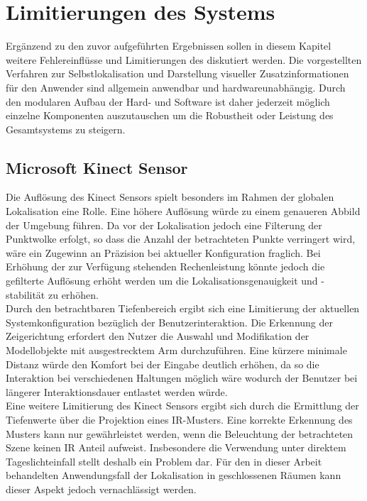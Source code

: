 \chapter{Limitierungen des Systems}
Ergänzend zu den zuvor aufgeführten Ergebnissen sollen in diesem Kapitel weitere Fehlereinflüsse und Limitierungen des  diskutiert werden. Die vorgestellten Verfahren zur Selbstlokalisation und Darstellung visueller Zusatzinformationen für den Anwender sind allgemein anwendbar und hardwareunabhängig. Durch den modularen Aufbau der Hard- und Software ist daher jederzeit möglich einzelne Komponenten auszutauschen um die Robustheit oder Leistung des Gesamtsystems zu steigern.

\section{Microsoft Kinect Sensor}
Die Auflösung des Kinect Sensors spielt besonders im Rahmen der globalen Lokalisation eine Rolle. Eine höhere Auflösung würde zu einem genaueren Abbild der Umgebung führen. Da vor der Lokalisation jedoch eine Filterung der Punktwolke erfolgt, so dass die Anzahl der betrachteten Punkte verringert wird, wäre ein Zugewinn an Präzision bei aktueller Konfiguration fraglich. Bei Erhöhung der zur Verfügung stehenden Rechenleistung könnte jedoch die gefilterte Auflösung erhöht werden um die Lokalisationsgenauigkeit und -stabilität zu erhöhen.\\

Durch den betrachtbaren Tiefenbereich ergibt sich eine Limitierung der aktuellen Systemkonfiguration bezüglich der Benutzerinteraktion. Die Erkennung der Zeigerichtung erfordert den Nutzer die Auswahl und Modifikation der Modellobjekte mit ausgestrecktem Arm durchzuführen. Eine kürzere minimale Distanz würde den Komfort bei der Eingabe deutlich erhöhen, da so die Interaktion bei verschiedenen Haltungen möglich wäre wodurch der Benutzer bei längerer Interaktionsdauer entlastet werden würde.\\

Eine weitere Limitierung des Kinect Sensors ergibt sich durch die Ermittlung der Tiefenwerte über die Projektion eines IR-Musters. Eine korrekte Erkennung des Musters kann nur gewährleistet werden, wenn die Beleuchtung der betrachteten Szene keinen IR Anteil aufweist. Insbesondere die Verwendung unter direktem Tageslichteinfall stellt deshalb ein Problem dar. Für den in dieser Arbeit behandelten Anwendungsfall der Lokalisation in geschlossenen Räumen kann dieser Aspekt jedoch vernachlässigt werden.

